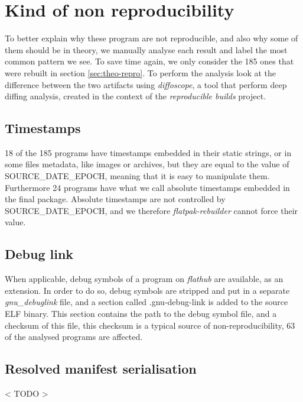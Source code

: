 \documentclass[a4paper,11pt,oneside]{report}
\newcommand{\sysname}{\emph{flatpak-rebuilder}\xspace}
\newcommand{\rb}{\emph{reproducible builds}\xspace}
\newcommand{\fh}{\emph{flathub}\xspace}
\newcommand{\sde}{SOURCE\_DATE\_EPOCH\xspace}
\newcommand{\dfc}{\emph{diffoscope}\xspace}
\begin{document}
\section{Kind of non reproducibility}
To better explain why these program are not reproducible, and also why some of
them should be in theory, we manually analyse each result and label the most
common pattern we see. To save time again, we only consider the 185 ones that
were rebuilt in section \autoref{sec:theo-repro}. To perform the analysis look
at the difference between the two artifacts using \dfc, a tool that perform
deep diffing analysis, created in the context of the \rb project.

\subsection{Timestamps}
18 of the 185 programs have timestamps embedded in their static strings, or in
some files metadata, like images or archives, but they are equal to the value
of \sde, meaning that it is easy to manipulate them. Furthermore 24 programs
have what we call absolute timestamps embedded in the final package. Absolute
timestamps are not controlled by \sde, and we therefore \sysname cannot force
their value.

\subsection{Debug link}
When applicable, debug symbols of a program on \fh are available, as an
extension. In order to do so, debug symbols are stripped and put in a separate
\emph{gnu\_debuglink} file, and a section called .gnu-debug-link is added to the
source ELF binary. This section contains the path to the debug symbol file, and
a checksum of this file, this checksum is a typical source of
non-reproducibility, 63 of the analysed programs are affected.


\subsection{Resolved manifest serialisation}
< TODO >
\end{document}
